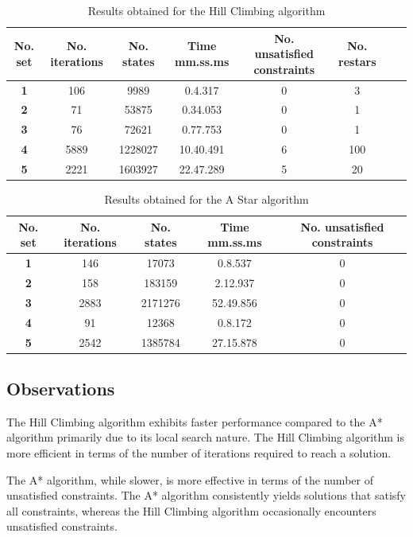 \documentclass[runningheads]{paper}
\begin{document}
\begin{table}[!]
\centering
\caption{Results obtained for the Hill Climbing algorithm}
\label{tab:results_hc}
\begin{tabular}{|c|c|c|c|c|c|c|c|}
\hline
\textbf{No. set} & \textbf{No. iterations} & \textbf{No. states} & \textbf{Time mm.ss.ms} & \textbf{No. unsatisfied constraints} & \textbf{No. restars} \\ \hline
\textbf{1} & 106 & 9989 & 0.4.317 & 0 & 3  \\ \hline 
\textbf{2} & 71 & 53875 & 0.34.053 & 0 & 1 \\ \hline
\textbf{3} & 76 & 72621 & 0.77.753 & 0 & 1  \\ \hline 
\textbf{4} & 5889 & 1228027 & 10.40.491 & 6 & 100 \\ \hline 
\textbf{5} & 2221 & 1603927 & 22.47.289 & 5 & 20 \\ \hline 
\end{tabular}
\end{table}

\begin{table}[!]
\centering
\caption{Results obtained for the A Star algorithm}
\label{tab:results_astar}
\begin{tabular}{|c|c|c|c|c|}
\hline
\textbf{No. set} & \textbf{No. iterations} & \textbf{No. states} & \textbf{Time mm.ss.ms} & \textbf{No. unsatisfied constraints} \\ \hline
\textbf{1} & 146 & 17073 & 0.8.537 & 0  \\ \hline
\textbf{2} & 158 & 183159 & 2.12.937 & 0  \\ \hline
\textbf{3} & 2883 & 2171276 & 52.49.856 & 0  \\ \hline
\textbf{4} & 91 & 12368 & 0.8.172 & 0  \\ \hline
\textbf{5} & 2542 & 1385784 & 27.15.878 & 0  \\ \hline
\end{tabular}
\end{table}

\subsection{Observations}

The Hill Climbing algorithm exhibits faster performance compared to the A* 
algorithm primarily due to its local search nature. The Hill Climbing algorithm
is more efficient in terms of the number of iterations required to reach a
solution.

The A* algorithm, while slower, is more effective in terms of the number of
unsatisfied constraints. The A* algorithm consistently yields solutions that
satisfy all constraints, whereas the Hill Climbing algorithm occasionally
encounters unsatisfied constraints.
\end{document}
